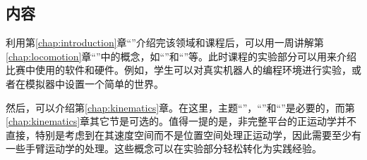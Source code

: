 
\subsection{内容}
\label{sec:curr1content}
利用第\ref{chap:introduction}章“”介绍完该领域和课程后，可以用一周讲解第\ref{chap:locomotion}章“”中的概念，如“”和“”等。此时课程的实验部分可以用来介绍比赛中使用的软件和硬件。例如，学生可以对真实机器人的编程环境进行实验，或者在模拟器中设置一个简单的世界。


然后，可以介绍第\ref{chap:kinematics}章。在这里，主题“”，“”和“”是必要的，而第\ref{chap:kinematics}章其它节是可选的。值得一提的是，非完整平台的正运动学并不直接，特别是考虑到在其速度空间而不是位置空间处理正运动学，因此需要至少有一些手臂运动学的处理。这些概念可以在实验部分轻松转化为实践经验。



